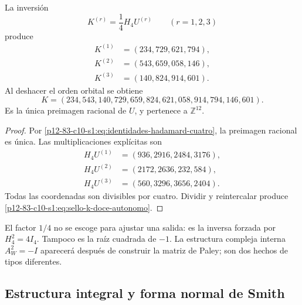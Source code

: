\begin{theorem}
\label{p12-83-c10-s1:thm:reconstruccion-entera-k-hadamard}
La inversión
\begin{equation}
 K^{(r)}=\frac14H_4U^{(r)}
 \qquad(r=1,2,3)
 \label{p12-83-c10-s1:eq:inversion-bloques-hadamard}
\end{equation}
produce
\begin{align*}
 K^{(1)}&=(234,729,621,794),\\
 K^{(2)}&=(543,659,058,146),\\
 K^{(3)}&=(140,824,914,601).
\end{align*}
Al deshacer el orden orbital se obtiene
\begin{equation}
 \boxed{
 K=(234,543,140,729,659,824,621,058,914,794,146,601).}
 \label{p12-83-c10-s1:eq:sello-k-doce-autonomo}
\end{equation}
Es la única preimagen racional de \(U\), y pertenece a
\(\mathbb Z^{12}\).
\end{theorem}

\begin{proof}
Por \eqref{p12-83-c10-s1:eq:identidades-hadamard-cuatro}, la preimagen racional es única.
Las multiplicaciones explícitas son
\begin{align*}
 H_4U^{(1)}&=(936,2916,2484,3176),\\
 H_4U^{(2)}&=(2172,2636,232,584),\\
 H_4U^{(3)}&=(560,3296,3656,2404).
\end{align*}
Todas las coordenadas son divisibles por cuatro. Dividir y reintercalar
produce \eqref{p12-83-c10-s1:eq:sello-k-doce-autonomo}.
\end{proof}

El factor \(1/4\) no se escoge para ajustar una salida: es la inversa
forzada por \(H_4^2=4I_4\). Tampoco es la raíz cuadrada de \(-1\). La
estructura compleja interna \(A_W^2=-I\) aparecerá después de construir la
matriz de Paley; son dos hechos de tipos diferentes.

\subsection{Estructura integral y forma normal de Smith}

